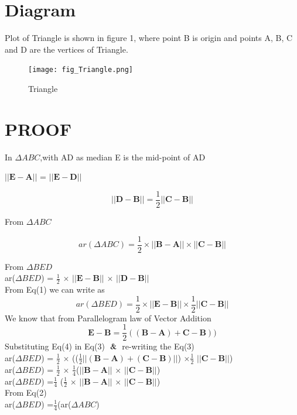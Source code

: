 \documentclass[journal,10pt,twocolumn]{article}
\let\vec\mathbf
\begin{document}
\section{Diagram}
Plot of Triangle is shown in figure 1, where point B is origin and points A, B, C and D are the vertices of Triangle.
\begin{figure}[h]
\texttt{[image: fig\_Triangle.png]}
\caption{Triangle}
\label{fig:Triangle}
\end{figure}
\section{PROOF}
In $\Delta ABC$,with AD as median
E is the mid-point of AD
\begin{center}
    $||{\vec{E-A}}||$ = $||{\vec{E-D}}||$
\end{center}
\begin{center}
\begin{equation}
    ||{\vec{D-B}}|| = \frac{1}{2} ||{\vec{C-B}}||
\end{equation}
\end{center}
\begin{flushleft}
From $\Delta ABC$
\end{flushleft}
\begin{equation}
    ar(\Delta ABC) = \frac{1}{2} \times ||{\vec{B-A}}|| \times ||{\vec{C-B}}||
\end{equation}
\begin{flushleft}
From $\Delta BED$
\vspace{0.3cm}\\
ar($\Delta BED$) = $\frac{1}{2}$ $\times$ $||{\vec{E-B}}||$ $\times$ $||{\vec{D-B}}||$
\vspace{0.3cm}\\
From Eq(1) we can write as
\begin{equation}
    ar(\Delta BED) = \frac{1}{2} \times ||{\vec{E-B}}|| \times\frac{1}{2} ||{\vec{C-B}}||
\end{equation}
We know that from Parallelogram law of Vector Addition
\begin{equation}
     \vec{E-B} = \frac{1}{2} ((\vec{B-A}) + \vec{C-B}))
\end{equation}
Substituting Eq(4) in Eq(3) $\And$ re-writing the Eq(3)\\
\vspace{0.3cm}
ar($\Delta BED$) = $\frac{1}{2}$ $\times$ (($\frac{1}{2}$$||{\vec{(B-A) + (C-B)}}||$) $\times$$\frac{1}{2}$ $||{\vec{C-B}}||$)
\vspace{0.5cm}\\
ar($\Delta BED$) = $\frac{1}{2}$ $\times$ $\frac{1}{4}$($||{\vec{B-A}}||$ $\times$ $||{\vec{C-B}}||$)
\vspace{0.5cm}\\
ar($\Delta BED$) =$\frac{1}{4}$ ($\frac{1}{2}$ $\times$ $||{\vec{B-A}}||$ $\times$ $||{\vec{C-B}}||$)
\vspace{0.5cm}\\
From Eq(2)
\vspace{0.3cm}\\
ar($\Delta BED$) =$\frac{1}{4}$(ar($\Delta ABC$)
\end{flushleft}
\end{document}
